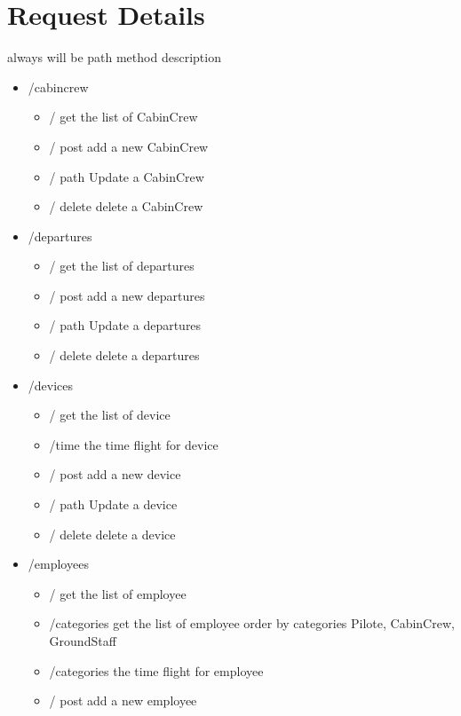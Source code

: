 \documentclass{article}
\begin{document}
    \section{Request Details}
    always will be path method description
    \begin{itemize}
        \item /cabincrew 
                \begin{itemize}
                    \item / get the list of CabinCrew
                    \item / post add a new CabinCrew  
                    \item / path Update a CabinCrew
                    \item / delete delete a CabinCrew
                \end{itemize}
        \item /departures
            \begin{itemize}
                \item / get the list of departures
                \item / post add a new departures  
                \item / path Update a departures
                \item / delete delete a departures
            \end{itemize}
        \item /devices
            \begin{itemize}
                \item / get the list of device
                \item /time the time flight for device
                \item / post add a new device  
                \item / path Update a device
                \item / delete delete a device
            \end{itemize}
        \item /employees
            \begin{itemize}
                \item / get the list of employee
                \item /categories get the list of employee order by categories Pilote, CabinCrew, GroundStaff
                \item /categories the time flight for employee
                \item / post add a new employee  

\end{itemize}
\end{itemize}
\end{document}
